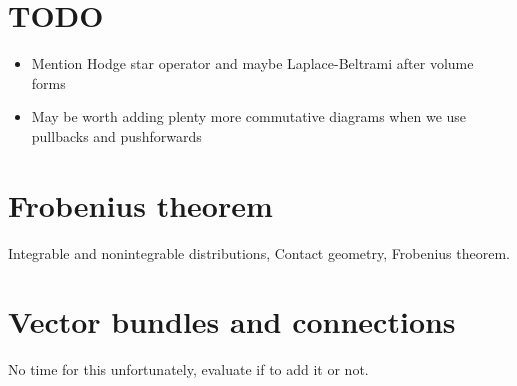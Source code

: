 \documentclass[nobib, a4paper]{tufte-book}
\theoremstyle{plain}
\theoremstyle{definition}
\theoremstyle{remark}
\newcommand{\Q}{\mathbb{Q}}
\newcommand{\R}{\mathbb{R}}
\begin{document}
\begin{appendices}
\chapter{TODO}
\begin{itemize}
  \item Mention Hodge star operator and maybe Laplace-Beltrami after volume forms
  \item May be worth adding plenty more commutative diagrams when we use pullbacks and pushforwards
\end{itemize}

\chapter{Frobenius theorem}
Integrable and nonintegrable distributions, Contact geometry, Frobenius theorem.

\chapter{Vector bundles and connections}
No time for this unfortunately, evaluate if to add it or not.
\end{appendices}

  
  

\printbibliography
{}
\end{document}
